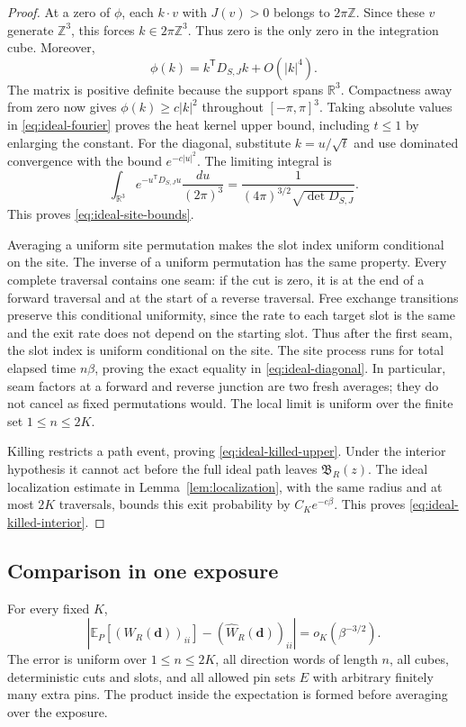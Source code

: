 \begin{proof}
At a zero of \(\phi\), each \(k\cdot v\) with \(J(v)>0\)
belongs to \(2\pi\mathbb Z\). Since these \(v\) generate
\(\mathbb Z^3\), this forces \(k\in2\pi\mathbb Z^3\). Thus zero
is the only zero in the integration cube. Moreover,
\[
 \phi(k)=k^{\mathsf T}D_{S,J}k+O(|k|^4).
\]
The matrix is positive definite because the support spans
\(\mathbb R^3\). Compactness away from zero now gives
\(\phi(k)\ge c|k|^2\) throughout \([-\pi,\pi]^3\).
Taking absolute values in \eqref{eq:ideal-fourier} proves the heat
kernel upper bound, including \(t\le1\) by enlarging the constant.
For the diagonal, substitute \(k=u/\sqrt t\) and use dominated
convergence with the bound \(e^{-c|u|^2}\). The limiting integral is
\[
 \int_{\mathbb R^3}e^{-u^{\mathsf T}D_{S,J}u}
                     \frac{du}{(2\pi)^3}
 =\frac1{(4\pi)^{3/2}\sqrt{\det D_{S,J}}}.
\]
This proves \eqref{eq:ideal-site-bounds}.

Averaging a uniform site permutation makes the slot index uniform
conditional on the site. The inverse of a uniform permutation has the
same property. Every complete traversal contains one seam: if the cut
is zero, it is at the end of a forward traversal and at the start of a
reverse traversal. Free exchange transitions preserve this conditional
uniformity, since the rate to each target slot is the same and the exit
rate does not depend on the starting slot. Thus after the first seam,
the slot index is uniform conditional on the site. The site process
runs for total elapsed time \(n\beta\), proving the exact equality
in \eqref{eq:ideal-diagonal}. In particular, seam factors at a forward
and reverse junction are two fresh averages; they do not cancel as
fixed permutations would. The local limit is uniform over the finite
set \(1\le n\le2K\).

Killing restricts a path event, proving \eqref{eq:ideal-killed-upper}.
Under the interior hypothesis it cannot act before the full ideal
path leaves \(\mathfrak B_R(z)\). The ideal localization estimate
in Lemma~\ref{lem:localization}, with the same radius and at most
\(2K\) traversals, bounds this exit probability by
\(C_K e^{-c\beta}\). This proves \eqref{eq:ideal-killed-interior}.
\end{proof}

\subsection{Comparison in one exposure}

\begin{proposition}\label{prop:finite-word}
For every fixed \(K\),
\begin{equation}\label{eq:finite-word}
 \left|\mathbb E_P[(W_R(\mathbf d))_{ii}]
                 -(\widehat W_R(\mathbf d))_{ii}\right|
       =o_K(\beta^{-3/2}).
\end{equation}
The error is uniform over \(1\le n\le2K\), all direction words of
length \(n\), all cubes, deterministic cuts and slots, and all allowed
pin sets \(E\) with arbitrary finitely many extra pins. The product
inside the expectation is formed before averaging over the exposure.
\end{proposition}

